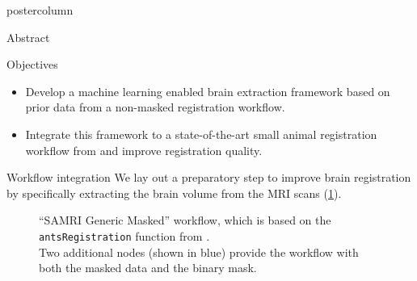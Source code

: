     \begin{frame}
        \vspace{2cm}
        \begin{columns}
            \begin{column}{.42\textwidth}
                \begin{beamercolorbox}[center]{postercolumn}
                    \begin{minipage}{.98\textwidth}  %
                        \parbox[t][\columnheight]{\textwidth}{ %
                            \begin{myblock}{Abstract}
                                
                            \end{myblock}\vfill

                            \begin{myblock}{Objectives}
                                \begin{itemize}
                                    \item Develop a machine learning enabled brain extraction framework based on prior data from a non-masked registration workflow.
                                    \item Integrate this framework to a state-of-the-art small animal registration workflow from \cite{irsabi} and improve registration quality.
                                \end{itemize}
                            \end{myblock}

                            \begin{myblock}{Workflow integration}
                                We lay out a preparatory step to improve brain registration by specifically extracting the brain volume from the MRI scans (\cref{masked_worklfow_graph}).
                                \vspace{-1.4em}
                                \begin{figure}
                                    \centering
                                    \vspace{-1.9em}
                                    \caption{
                                        “SAMRI Generic Masked” workflow, which is based on the \textcolor{mg}{\texttt{antsRegistration}} function from \cite{irsabi}.\\
                                        Two additional nodes (shown in blue) provide the workflow with both the masked data and the binary mask.
                                    }
                                    \label{masked_worklfow_graph}
                                \end{figure}


\end{myblock}}
\end{minipage}
\end{beamercolorbox}
\end{column}
\end{columns}
\end{frame}

